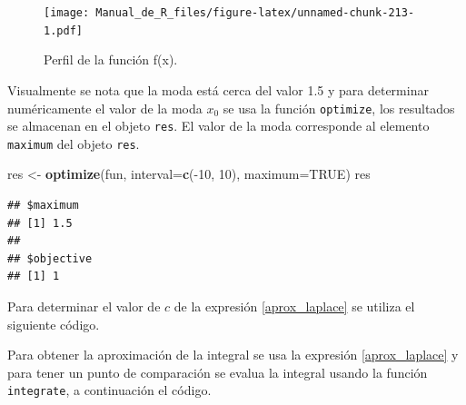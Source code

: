 \documentclass[10pt,]{krantz}
\makeatletter
\newenvironment{Shaded}{\begin{snugshade}}{\end{snugshade}}
\newcommand{\KeywordTok}[1]{\textcolor[rgb]{0.13,0.29,0.53}{\textbf{{#1}}}}
\newcommand{\DataTypeTok}[1]{\textcolor[rgb]{0.13,0.29,0.53}{{#1}}}
\newcommand{\DecValTok}[1]{\textcolor[rgb]{0.00,0.00,0.81}{{#1}}}
\newcommand{\StringTok}[1]{\textcolor[rgb]{0.31,0.60,0.02}{{#1}}}
\newcommand{\OtherTok}[1]{\textcolor[rgb]{0.56,0.35,0.01}{{#1}}}
\newcommand{\NormalTok}[1]{{#1}}
\newenvironment{kframe}{%
\medskip{}
\setlength{\fboxsep}{.8em}
 \def\at@end@of@kframe{}%
 \ifinner\ifhmode%
  \def\at@end@of@kframe{\end{minipage}}%
  \begin{minipage}{\columnwidth}%
 \fi\fi%
 \def\FrameCommand##1{\hskip\@totalleftmargin \hskip-\fboxsep
 \colorbox{shadecolor}{##1}\hskip-\fboxsep
     \hskip-\linewidth \hskip-\@totalleftmargin \hskip\columnwidth}%
 \MakeFramed {\advance\hsize-\width
   \@totalleftmargin\z@ \linewidth\hsize
   \@setminipage}}%
 {\par\unskip\endMakeFramed%
 \at@end@of@kframe}
\renewenvironment{Shaded}{\begin{kframe}}{\end{kframe}}
\makeatother
\begin{document}
\begin{figure}[htbp]
\centering
\texttt{[image: Manual\_de\_R\_files/figure-latex/unnamed-chunk-213-1.pdf]}
\caption{\label{fig:unnamed-chunk-213}Perfil de la función f(x).}
\end{figure}

Visualmente se nota que la moda está cerca del valor 1.5 y para
determinar numéricamente el valor de la moda \(x_0\) se usa la función
\texttt{optimize}, los resultados se almacenan en el objeto
\texttt{res}. El valor de la moda corresponde al elemento
\texttt{maximum} del objeto \texttt{res}.

\begin{Shaded}
\begin{Highlighting}[]
\NormalTok{res <-}\StringTok{ }\KeywordTok{optimize}\NormalTok{(fun, }\DataTypeTok{interval=}\KeywordTok{c}\NormalTok{(-}\DecValTok{10}\NormalTok{, }\DecValTok{10}\NormalTok{), }\DataTypeTok{maximum=}\OtherTok{TRUE}\NormalTok{)}
\NormalTok{res}
\end{Highlighting}
\end{Shaded}

\begin{verbatim}
## $maximum
## [1] 1.5
## 
## $objective
## [1] 1
\end{verbatim}

Para determinar el valor de \(c\) de la expresión \ref{aprox_laplace} se
utiliza el siguiente código.

\begin{Shaded}
\end{Shaded}

Para obtener la aproximación de la integral se usa la expresión
\ref{aprox_laplace} y para tener un punto de comparación se evalua la
integral usando la función \texttt{integrate}, a continuación el código.

\begin{Shaded}
\end{Shaded}
\end{document}
